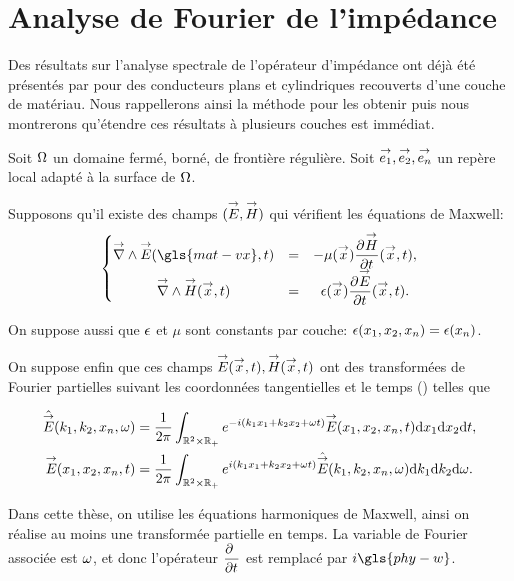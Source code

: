 \section{Analyse de Fourier de l'impédance}

Des résultats sur l'analyse spectrale de l'opérateur d'impédance ont déjà été présentés par \cite{hoppe_impedance_1995} pour des conducteurs plans et cylindriques recouverts d'une couche de matériau.
Nous rappellerons ainsi la méthode pour les obtenir puis nous montrerons qu’étendre ces résultats à plusieurs couches est immédiat. 

Soit \(\OO\) un domaine fermé, borné, de frontière régulière. Soit \(\vect{e_1},\vect{e_2},\vect{e_n}\) un repère local adapté à la surface de \(\OO\).

Supposons qu'il existe des champs \((\vE,\vect H)\) qui vérifient les équations de Maxwell:
\begin{equation*}
    \left\lbrace
    \begin{matrix}
    \vrot \vE(\gls{mat-vx},t) &=& -\mu(\vx) \ddr{t}{\vect H}(\vx,t),
    \\
    \vrot \vect H(\vx,t) &=& \eps(\vx) \ddr{t}{\vE}(\vx,t).
    \end{matrix}
    \right.
\end{equation*}

On suppose aussi que \(\eps\) et \(\mu\) sont constants par couche: \(\eps(x_1,x_2,x_n)=\eps(x_n)\).

On suppose enfin que ces champs \(\vE(\vx,t),\vect H(\vx,t)\) ont des transformées de Fourier partielles suivant les coordonnées tangentielles et le temps
(\cite[Théorème de Plancherel, p.~153]{yosida_functional_1995}) telles que

\begin{align*}
    \hat{\vE} (k_1,k_2,x_n,\w) &= \frac{1}{2\pi}\int_{\RR^2\times\RR_+} e^{-i(k_1x_1+k_2x_2+\w t)}\vE(x_1,x_2,x_n,t) \dd{x_1}\dd{x_2}\dd{t},
    \\
    \vE(x_1,x_2,x_n,t) &= \frac{1}{2\pi}\int_{\RR^2\times\RR_+} e^{i(k_1x_1+k_2x_2+\w t)}\hat{\vE} (k_1,k_2,x_n,\w) \dd{k_1}\dd{k_2} \dd{\w}.
\end{align*}

Dans cette thèse, on utilise les équations harmoniques de Maxwell, ainsi on réalise au moins une transformée partielle en temps. La variable de Fourier associée est \(\w\), et donc l'opérateur \(\ddr{t}{~}\) est remplacé par \(i\gls{phy-w}\).

